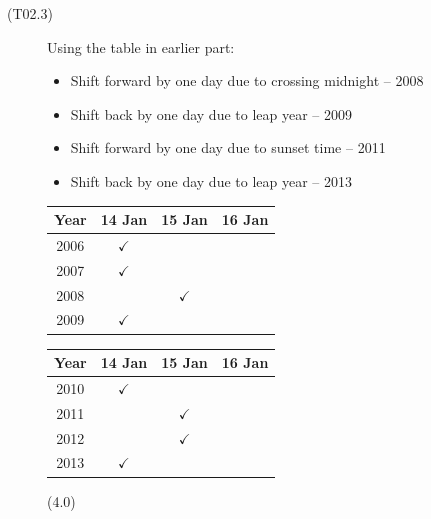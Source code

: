 \begin{description}
\item[(T02.3)] Using the table in earlier part:
  \begin{itemize}
  \item Shift forward by one day due to crossing midnight -- 2008
  \item Shift back by one day due to leap year -- 2009
  \item Shift forward by one day due to sunset time -- 2011
  \item Shift back by one day due to leap year -- 2013
  \end{itemize}

  \begin{center}
  \begin{tabular}{|c|c|c|c|}
  \hline
  Year & 14 Jan & 15 Jan & 16 Jan\\
  \hline
  2006 & $\checkmark$ & & \\
  2007 & $\checkmark$ & & \\
  2008 & & $\checkmark$ & \\
  2009 & $\checkmark$ & & \\
  \hline
  \end{tabular}
  \quad
  \begin{tabular}{|c|c|c|c|}
  \hline
  Year & 14 Jan & 15 Jan & 16 Jan\\
  \hline
  2010 & $\checkmark$ & & \\
  2011 & & $\checkmark$ & \\
  2012 & & $\checkmark$ & \\
  2013 & $\checkmark$ & & \\
  \hline
  \end{tabular}
  \end{center}
  \hfill(4.0)
\end{description}

